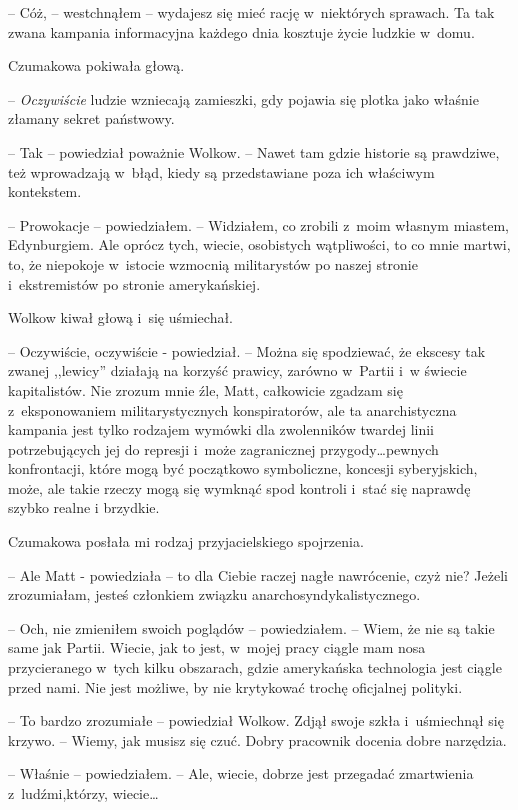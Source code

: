 \documentclass[oneside,polish,12pt,sfheadings]{mwbk}
\begin{document}
-- Cóż, -- westchnąłem -- wydajesz się mieć rację w~niektórych sprawach. Ta
tak zwana kampania informacyjna każdego dnia kosztuje życie ludzkie w~domu.

Czumakowa pokiwała głową. 

-- \emph{Oczywiście} ludzie wzniecają
zamieszki, gdy pojawia się plotka jako właśnie złamany sekret państwowy.

-- Tak -- powiedział poważnie Wolkow. -- Nawet tam gdzie historie są
prawdziwe, też wprowadzają w~błąd, kiedy są przedstawiane poza ich
właściwym kontekstem.

-- Prowokacje -- powiedziałem. -- Widziałem, co zrobili z~moim własnym
miastem, Edynburgiem. Ale oprócz tych, wiecie, osobistych wątpliwości,
to co mnie martwi, to, że niepokoje w~istocie wzmocnią militarystów po
naszej stronie i~ekstremistów po stronie amerykańskiej.

Wolkow kiwał głową i~się uśmiechał. 

-- Oczywiście, oczywiście -
powiedział. -- Można się spodziewać, że ekscesy tak zwanej ,,lewicy''
działają na korzyść prawicy, zarówno w~Partii i~w świecie kapitalistów.
Nie zrozum mnie źle, Matt, całkowicie zgadzam się z~eksponowaniem
militarystycznych konspiratorów, ale ta anarchistyczna kampania jest
tylko rodzajem wymówki dla zwolenników twardej linii potrzebujących jej
do represji i~może zagranicznej przygody\ldots pewnych konfrontacji, które
mogą być początkowo symboliczne, koncesji syberyjskich, może, ale takie
rzeczy mogą się wymknąć spod kontroli i~stać się naprawdę szybko realne
i brzydkie.

Czumakowa posłała mi rodzaj przyjacielskiego spojrzenia. 

-- Ale Matt -
powiedziała -- to dla Ciebie raczej nagłe nawrócenie, czyż nie? Jeżeli
zrozumiałam, jesteś członkiem związku anarchosyndykalistycznego.

-- Och, nie zmieniłem swoich poglądów -- powiedziałem. -- Wiem, że nie są
takie same jak Partii. Wiecie, jak to jest, w~mojej pracy ciągle mam
nosa przycieranego w~tych kilku obszarach, gdzie amerykańska technologia
jest ciągle przed nami. Nie jest możliwe, by nie krytykować trochę
oficjalnej polityki.

-- To bardzo zrozumiałe -- powiedział Wolkow. Zdjął swoje szkła i~uśmiechnął się krzywo. -- Wiemy, jak musisz się czuć. Dobry pracownik
docenia dobre narzędzia.

-- Właśnie -- powiedziałem. -- Ale, wiecie, dobrze jest przegadać
zmartwienia z~ludźmi,którzy, wiecie\ldots
\end{document}
